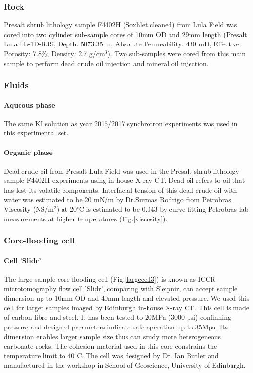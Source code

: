 \subsubsection{Rock}
Presalt shrub lithology sample F4402H (Soxhlet cleaned) from Lula Field was cored into two cylinder sub-sample cores of 10mm OD and 29mm length (Presalt Lula LL-1D-RJS, Depth: 5073.35 m, Absolute Permeability: 430 mD, Effective Porosity: 7.8\%; Density: 2.7 g/cm$^3$). Two sub-samples were cored from this main sample to perform dead crude oil injection and mineral oil injection.

\subsubsection{Fluids}
\paragraph{Aqueous phase}
The same KI solution as year 2016/2017 synchrotron experiments was used in this experimental set.

\paragraph{Organic phase}
Dead crude oil from Presalt Lula Field was used in the Presalt shrub lithology sample F4402H experiments using in-house X-ray \textmu CT. Dead oil refers to oil that has lost its volatile components. Interfacial tension of this dead crude oil with water was estimated to be 20 mN/m by Dr.Surmas Rodrigo from Petrobras. Viscosity (NS/m$^2$) at 20$^{\circ}$C is estimated to be 0.043 by curve fitting Petrobras lab measurements at higher temperatures (Fig.\ref{viscosity}).

\subsubsection{Core-flooding cell}
\paragraph{Cell 'Slidr'}
The large sample core-flooding cell (Fig.\ref{largecell3}) is known as ICCR microtomography flow cell 'Slidr', comparing with Sleipnir, can accept sample dimension up to 10mm OD and 40mm length and elevated pressure. We used this cell for larger samples imaged by Edinburgh in-house X-ray \textmu CT. This cell is made of carbon fibre and steel. It has been tested to 20MPa (3000 psi) confinning pressure and designed parameters indicate safe operation up to 35Mpa. Its dimension enables larger sample size thus can study more heterogeneous carbonate rocks. The cohesion material used in this core constrains the temperature limit to 40$^{\circ}$C. The cell was designed by Dr. Ian Butler and manufactured in the workshop in School of Geoscience, University of Edinburgh.

